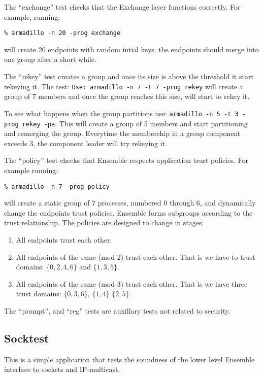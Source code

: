 The ``exchange'' test checks that the Exchange layer functions
correctly. For example, running:
\begin{verbatim}
% armadillo -n 20 -prog exchange
\end{verbatim}
will create 20 endpoints with random intial keys. the endpoints should
merge into one group after a short while.

The ``rekey'' test creates a group and once its size is above the
threshold it start rekeying it. The test: {\tt Use: armadillo -n 7 -t
7 -prog rekey} will create a group of 7 members and once the group
reaches this size, will start to rekey it.
		
To see what happens when the group partitions use: {\tt armadillo -n 5
-t 3 -prog rekey -pa}. This will create a group of 5 members and start
partitioning and remerging the group. Everytime the membership in a
group component exceeds 3, the component leader will try rekeying it. 

The ``policy'' test checks that Ensemble respects application trust
policies. For example running:
\begin{verbatim}
% armadillo -n 7 -prog policy
\end{verbatim}
will create a static group of 7 processes, numbered 0 through 6, and
dynamically change the endpoints trust policies. Ensemble forms
subgroups according to the trust relationship. The policies are
designed to change in stages:
\begin{enumerate}
\item All endpoints trust each other.
\item 
All endpoints of the same (mod 2) trust each other. That is we
have to trust domains: $\{0,2,4,6\}$ and $\{1,3,5\}$.
\item 
All endpoints of the same (mod 3) trust each other. That is we
have three trust domains: $\{0,3,6\}$, $\{1,4\}$ $\{2,5\}$.
\end{enumerate}

The ``prompt'', and ``reg'' tests are auxillary tests not related
to security. 


\subsection{Socktest}
This is a simple application that tests the soundness of the
lower level Ensemble interface to sockets and IP-multicast.

